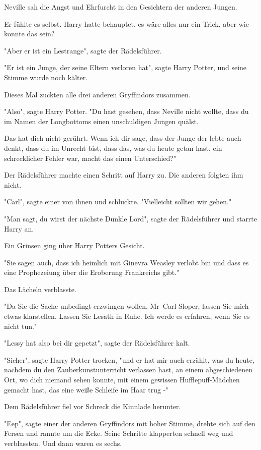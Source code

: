 {Neville sah die Angst und Ehrfurcht in den Gesichtern der anderen Jungen.

Er fühlte es selbst. Harry hatte behauptet, es wäre alles nur ein Trick, aber wie konnte das sein?

"Aber er ist ein Lestrange", sagte der Rädelsführer.

"Er ist ein Junge, der seine Eltern verloren hat", sagte Harry Potter, und seine Stimme wurde noch kälter.

Dieses Mal zuckten alle drei anderen Gryffindors zusammen.

"Also", sagte Harry Potter. "Du hast gesehen, dass Neville nicht wollte, dass du im Namen der Longbottoms einen unschuldigen Jungen quälst.

Das hat dich nicht gerührt. Wenn ich dir sage, dass der Junge-der-lebte auch denkt, dass du im Unrecht bist, dass das, was du heute getan hast, ein schrecklicher Fehler war, macht das einen Unterschied?"

Der Rädelsführer machte einen Schritt auf Harry zu. Die anderen folgten ihm nicht.

"Carl", sagte einer von ihnen und schluckte. "Vielleicht sollten wir gehen."

"Man sagt, du wirst der nächste Dunkle Lord", sagte der Rädelsführer und starrte Harry an.

Ein Grinsen ging über Harry Potters Gesicht.

"Sie sagen auch, dass ich heimlich mit Ginevra Weasley verlobt bin und dass es eine Prophezeiung über die Eroberung Frankreichs gibt."

Das Lächeln verblasste.

"Da Sie die Sache unbedingt erzwingen wollen, Mr~Carl Sloper, lassen Sie mich etwas klarstellen. Lassen Sie Lesath in Ruhe. Ich werde es erfahren, wenn Sie es nicht tun."

"Lessy hat also bei dir gepetzt", sagte der Rädelsführer kalt.

"Sicher", sagte Harry Potter trocken, "und er hat mir auch erzählt, was du heute, nachdem du den Zauberkunstunterricht verlassen hast, an einem abgeschiedenen Ort, wo dich niemand sehen konnte, mit einem gewissen Hufflepuff-Mädchen gemacht hast, das eine weiße Schleife im Haar trug -"

Dem Rädelsführer fiel vor Schreck die Kinnlade herunter.

"Eep", sagte einer der anderen Gryffindors mit hoher Stimme, drehte sich auf den Fersen und rannte um die Ecke. Seine Schritte klapperten schnell weg und verblassten. Und dann waren es sechs.

}
